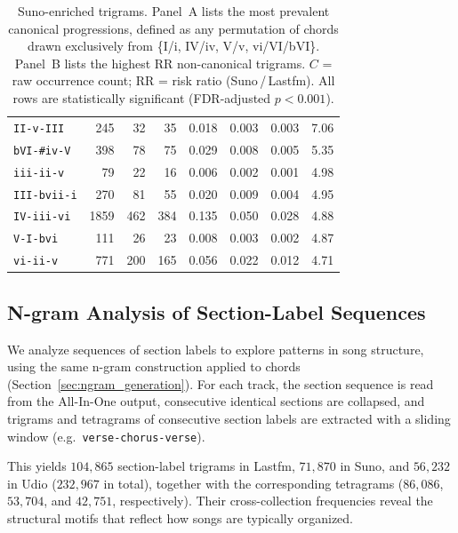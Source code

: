 \documentclass{article}
\begin{document}
\begin{table}[!ht]
\begin{tabular}{@{}lrrrrrrc@{}}
\texttt{II-v-III} & 245 & 32 & 35 & 0.018 & 0.003 & 0.003 & 7.06 \\
\texttt{bVI-\#iv-V} & 398 & 78 & 75 & 0.029 & 0.008 & 0.005 & 5.35 \\
\texttt{iii-ii-v} & 79 & 22 & 16 & 0.006 & 0.002 & 0.001 & 4.98 \\
\texttt{III-bvii-i} & 270 & 81 & 55 & 0.020 & 0.009 & 0.004 & 4.95 \\
\texttt{IV-iii-vi} & 1859 & 462 & 384 & 0.135 & 0.050 & 0.028 & 4.88 \\
\texttt{V-I-bvi} & 111 & 26 & 23 & 0.008 & 0.003 & 0.002 & 4.87 \\
\texttt{vi-ii-v} & 771 & 200 & 165 & 0.056 & 0.022 & 0.012 & 4.71 \\
\bottomrule
\end{tabular}

\caption{Suno-enriched trigrams. Panel~A lists the most prevalent canonical progressions, defined as any permutation of chords drawn exclusively from \{I/i, IV/iv, V/v, vi/VI/bVI\}. Panel~B lists the highest RR non-canonical trigrams. $C$ = raw occurrence count; RR = risk ratio (Suno\,/\,Lastfm). All rows are statistically significant (FDR-adjusted $p < 0.001$).}
\label{tab:suno_enrichment}
\end{table}

\subsection{N-gram Analysis of Section-Label Sequences}
\label{sec:form_ngram}

We analyze sequences of section labels to explore patterns in song structure, using the same n-gram construction applied to chords (Section~\ref{sec:ngram_generation}).
For each track, the section sequence is read from the All-In-One output, consecutive identical sections are collapsed, and trigrams and tetragrams of consecutive section labels are extracted with a sliding window (e.g.\ \texttt{verse-chorus-verse}).

This yields $104{,}865$ section-label trigrams in Lastfm, $71{,}870$ in Suno, and $56{,}232$ in Udio ($232{,}967$ in total), together with the corresponding tetragrams ($86{,}086$, $53{,}704$, and $42{,}751$, respectively). Their cross-collection frequencies reveal the structural motifs that reflect how songs are typically organized.
\end{document}
